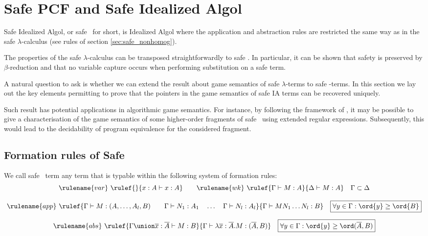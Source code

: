 \section{Safe PCF and Safe Idealized Algol}

Safe Idealized Algol, or safe \ialgol\ for short, is Idealized Algol
where the application and abstraction rules are restricted the same
way as in the safe $\lambda$-calculus (see rules of section
\ref{sec:safe_nonhomog}).

The properties of the safe $\lambda$-calculus can be transposed
straightforwardly to safe \ialgol. In particular, it can be shown
that safety is preserved by $\beta$-reduction and that no variable
capture occurs when performing substitution on a safe term.

A natural question to ask is whether we can extend the result about
game semantics of safe $\lambda$-terms to safe \ialgol-terms. In
this section we lay out the key elements permitting to prove that
the pointers in the game semantics of safe IA terms can be recovered
uniquely.

Such result has potential applications in algorithmic game semantics.
For instance, by following the framework of \cite{ghicamccusker00},
it may be possible to give a characterisation of the game semantics
of some higher-order fragments of safe \ialgol\ using extended
regular expressions. Subsequently, this would lead to the
decidability of program equivalence for the considered fragment.


\subsection{Formation rules of Safe \ialgol}
We call safe \ialgol\ term any term that is typable within the
following system of formation rules:
$$ \rulename{var} \   \rulef{}{x : A\vdash x : A}
\qquad  \rulename{wk} \   \rulef{\Gamma \vdash M : A}{\Delta \vdash
M : A} \quad  \Gamma \subset \Delta$$

$$ \rulename{app} \  \rulef{\Gamma \vdash M : (A,\ldots,A_l,B)
                                        \qquad \Gamma \vdash N_1 : A_1
                                        \quad \ldots \quad \Gamma \vdash N_l : A_l  }
                                   {\Gamma  \vdash M N_1 \ldots N_l : B}
                                    \quad
\mbox{\fbox{$\forall y \in \Gamma : \ord{y} \geq \ord{B}$}}$$

$$ \rulename{abs} \   \rulef{\Gamma \union \overline{x} : \overline{A} \vdash M : B}
                                   {\Gamma  \vdash \lambda \overline{x} : \overline{A} . M : (\overline{A},B)} \quad
\mbox{\fbox{$\forall y \in \Gamma : \ord{y} \geq \ord(\overline{A},B)$}}$$

